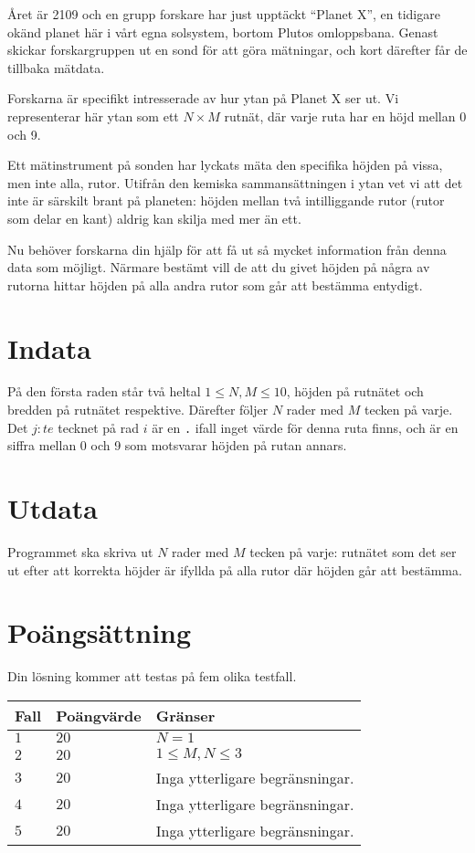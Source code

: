 Året är 2109 och en grupp forskare har just upptäckt ``Planet X'', 
en tidigare okänd planet här i vårt egna solsystem,
bortom Plutos omloppsbana. Genast skickar forskargruppen ut
en sond för att göra mätningar, och kort därefter får de tillbaka mätdata.

Forskarna är specifikt intresserade av hur ytan på Planet X ser ut.
Vi representerar här ytan som ett $N \times M$ rutnät, där varje ruta
har en höjd mellan 0 och 9.

Ett mätinstrument på sonden har lyckats mäta den specifika höjden
på vissa, men inte alla, rutor. Utifrån den kemiska sammansättningen i ytan vet vi att det inte 
är särskilt brant på planeten: höjden mellan två
intilliggande rutor (rutor som delar en kant) aldrig kan skilja 
med mer än ett. 

Nu behöver forskarna din hjälp för att få ut så mycket information
från denna data som möjligt. Närmare bestämt vill de att du givet höjden
på några av rutorna hittar höjden på alla andra rutor som går att bestämma entydigt.

\section*{Indata}
På den första raden står två heltal $1 \le N,M \le 10$, 
höjden på rutnätet och bredden på rutnätet respektive.
Därefter följer $N$ rader med $M$ tecken på varje.
Det $j:te$ tecknet på rad $i$ är en \texttt{.} ifall
inget värde för denna ruta finns, och är en siffra mellan
0 och 9 som motsvarar höjden på rutan annars.

\section*{Utdata}
Programmet ska skriva ut $N$ rader med $M$ tecken på varje:
rutnätet som det ser ut efter att
korrekta höjder är ifyllda på alla rutor där höjden går att bestämma.

\section*{Poängsättning}
Din lösning kommer att testas på fem olika testfall.

\noindent
\begin{tabular}{| l | l | l |}
  \hline
  Fall & Poängvärde & Gränser \\ \hline
  $1$    & $20$        &  $N = 1$\\ \hline 
  $2$    & $20$        &  $1 \leq M, N \leq 3$\\ \hline 
  $3$    & $20$        &  Inga ytterligare begränsningar. \\ \hline
  $4$    & $20$        &  Inga ytterligare begränsningar. \\ \hline
  $5$    & $20$        &  Inga ytterligare begränsningar. \\ \hline
\end{tabular}

